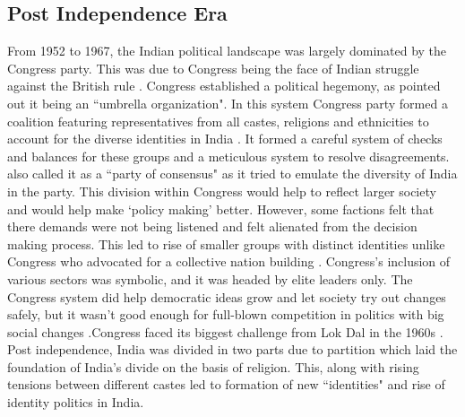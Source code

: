 \begin{sloppypar}
\subsection{Post Independence Era}
 From 1952 to 1967, the Indian political landscape was largely dominated by the Congress party. This was due to Congress being the face of Indian struggle against the British rule \citep{shastri1991nehru}. Congress established a political hegemony, as \cite{kothari1967india} pointed out it being an ``umbrella organization". In this system Congress party formed a  coalition featuring representatives from all castes, religions and ethnicities to account for the diverse identities in India \citep{anand2015downfall}. It formed a careful system of checks and balances for these groups and a meticulous system to resolve disagreements. \cite{kothari1967india} also called it as a ``party of consensus" as it tried to emulate the diversity of India in the party. This division within Congress would help to reflect larger society and would help make `policy making'  better. However, some factions felt that there demands were not being listened and felt alienated from the decision making process. This led to rise of smaller groups with distinct identities unlike Congress who advocated for a collective nation building \citep{shastri2003continuity}.  Congress’s inclusion of various sectors was symbolic, and it was headed by elite leaders only. The Congress system did help democratic ideas grow and let society try out changes safely, but it wasn’t good enough for full-blown competition in politics with big social changes \citep{shastri2009electoral}.Congress faced its biggest challenge from Lok Dal in the 1960s \citep{desouza2006india}. Post independence, India was divided in two parts due to partition which laid the foundation of India's divide on the basis of religion. This, along with rising tensions between different castes led to formation of new ``identities" and rise of identity politics in India. 

\end{sloppypar}
